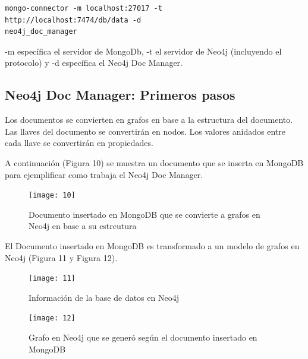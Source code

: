 \documentclass[conference]{IEEEtran}
\begin{document}
\begin{lstlisting}
mongo-connector -m localhost:27017 -t
http://localhost:7474/db/data -d
neo4j_doc_manager
\end{lstlisting}

-m espec\'ifica el servidor de MongoDb, -t el servidor de Neo4j (incluyendo el protocolo) y -d espec\'ifica el Neo4j Doc Manager.

\subsection*{Neo4j Doc Manager: Primeros pasos}

Los documentos se convierten en grafos en base a la estructura del documento. Las llaves del documento se convertir\'an en nodos. Los valores anidados entre cada llave se convertir\'an en propiedades.

A continuaci\'on (Figura 10) se muestra un documento que se inserta en MongoDB para ejemplificar como trabaja el Neo4j Doc Manager.

\begin{figure}[!h]
\centering
\texttt{[image: 10]}
\caption{Documento insertado en MongoDB que se convierte a grafos en Neo4j en base a su estrcutura}
\label{}
\end{figure}

El Documento insertado en MongoDB es transformado a un modelo de grafos en Neo4j (Figura 11 y Figura 12).\\

\begin{figure}[!h]
\centering
\texttt{[image: 11]}
\caption{Informaci\'on de la base de datos en Neo4j}
\label{}
\end{figure}

\begin{figure}[!h]
\centering
\texttt{[image: 12]}
\caption{Grafo en Neo4j que se gener\'o seg\'un el documento insertado en MongoDB}
\label{}
\end{figure}
\end{document}
